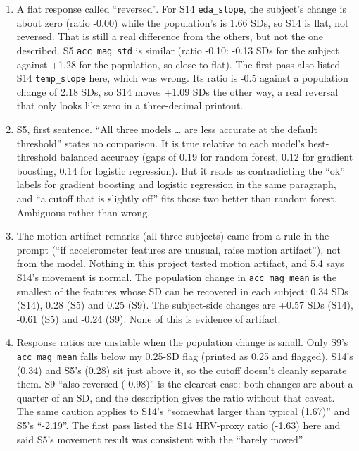 \documentclass[11pt]{article}
\providecommand{\tightlist}{\setlength{\itemsep}{2pt}\setlength{\parskip}{0pt}}
\begin{document}
\begin{enumerate}
\def\labelenumi{\arabic{enumi}.}
\tightlist
\item
  A flat response called ``reversed''. For S14 \texttt{eda\_slope}, the
  subject's change is about zero (ratio -0.00) while the population's is
  1.66 SDs, so S14 is flat, not reversed. That is still a real
  difference from the others, but not the one described. S5
  \texttt{acc\_mag\_std} is similar (ratio -0.10: -0.13 SDs for the
  subject against +1.28 for the population, so close to flat). The first
  pass also listed S14 \texttt{temp\_slope} here, which was wrong. Its
  ratio is -0.5 against a population change of 2.18 SDs, so S14 moves
  +1.09 SDs the other way, a real reversal that only looks like zero in
  a three-decimal printout.
\item
  S5, first sentence. ``All three models \ldots{} are less accurate at
  the default threshold'' states no comparison. It is true relative to
  each model's best-threshold balanced accuracy (gaps of 0.19 for random
  forest, 0.12 for gradient boosting, 0.14 for logistic regression). But
  it reads as contradicting the ``ok'' labels for gradient boosting and
  logistic regression in the same paragraph, and ``a cutoff that is
  slightly off'' fits those two better than random forest. Ambiguous
  rather than wrong.
\item
  The motion-artifact remarks (all three subjects) came from a rule in
  the prompt (``if accelerometer features are unusual, raise motion
  artifact''), not from the model. Nothing in this project tested motion
  artifact, and 5.4 says S14's movement is normal. The population change
  in \texttt{acc\_mag\_mean} is the smallest of the features whose SD
  can be recovered in each subject: 0.34 SDs (S14), 0.28 (S5) and 0.25
  (S9). The subject-side changes are +0.57 SDs (S14), -0.61 (S5) and
  -0.24 (S9). None of this is evidence of artifact.
\item
  Response ratios are unstable when the population change is small. Only
  S9's \texttt{acc\_mag\_mean} falls below my 0.25-SD flag (printed as
  0.25 and flagged). S14's (0.34) and S5's (0.28) sit just above it, so
  the cutoff doesn't cleanly separate them. S9 ``also reversed (-0.98)''
  is the clearest case: both changes are about a quarter of an SD, and
  the description gives the ratio without that caveat. The same caution
  applies to S14's ``somewhat larger than typical (1.67)'' and S5's
  ``-2.19''. The first pass listed the S14 HRV-proxy ratio (-1.63) here
  and said S5's movement result was consistent with the ``barely moved''

\end{enumerate}
\end{document}
